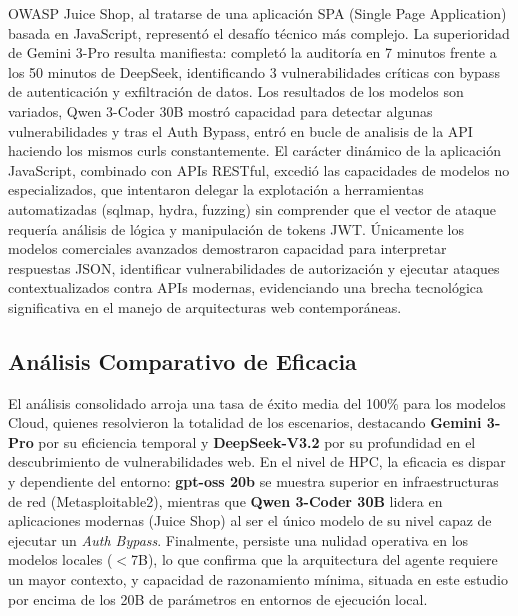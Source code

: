 OWASP Juice Shop, al tratarse de una aplicación SPA (Single Page Application) basada en JavaScript, representó el desafío técnico más complejo. La superioridad de Gemini 3-Pro resulta manifiesta: completó la auditoría en 7 minutos frente a los 50 minutos de DeepSeek, identificando 3 vulnerabilidades críticas con bypass de autenticación y exfiltración de datos. Los resultados de los modelos son variados, Qwen 3-Coder 30B mostró capacidad para detectar algunas vulnerabilidades y tras el Auth Bypass, entró en bucle de analisis de la API haciendo los mismos curls constantemente. El carácter dinámico de la aplicación JavaScript, combinado con APIs RESTful, excedió las capacidades de modelos no especializados, que intentaron delegar la explotación a herramientas automatizadas (sqlmap, hydra, fuzzing) sin comprender que el vector de ataque requería análisis de lógica y manipulación de tokens JWT. Únicamente los modelos comerciales avanzados demostraron capacidad para interpretar respuestas JSON, identificar vulnerabilidades de autorización y ejecutar ataques contextualizados contra APIs modernas, evidenciando una brecha tecnológica significativa en el manejo de arquitecturas web contemporáneas.

\subsection{Análisis Comparativo de Eficacia}

El análisis consolidado arroja una tasa de éxito media del 100\% para los modelos Cloud, quienes resolvieron la totalidad de los escenarios, destacando \textbf{Gemini 3-Pro} por su eficiencia temporal y \textbf{DeepSeek-V3.2} por su profundidad en el descubrimiento de vulnerabilidades web. En el nivel de HPC, la eficacia es dispar y dependiente del entorno: \textbf{gpt-oss 20b} se muestra superior en infraestructuras de red (Metasploitable2), mientras que \textbf{Qwen 3-Coder 30B} lidera en aplicaciones modernas (Juice Shop) al ser el único modelo de su nivel capaz de ejecutar un \textit{Auth Bypass}. Finalmente, persiste una nulidad operativa en los modelos locales ($<$7B), lo que confirma que la arquitectura del agente requiere un mayor contexto, y capacidad de razonamiento mínima, situada en este estudio por encima de los 20B de parámetros en entornos de ejecución local.

